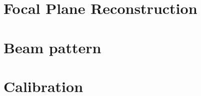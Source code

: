 \documentclass[a4paper, 11pt]{report}
\begin{document}
\chapter{Focal Plane Reconstruction}%
\label{se:fp_reconstruction}



\clearpage
\chapter{Beam pattern}%
\label{se:beams}

\clearpage
%

\clearpage
%
\chapter{Calibration}%
\label{se:calibration}









\end{document}
